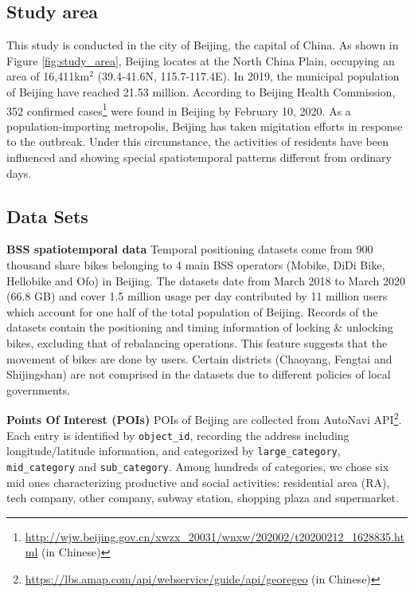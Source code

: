 \documentclass[preprints,ijgi,submit,moreauthors]{Definitions/mdpi}
\begin{document}
\subsection{Study area}
This study is conducted in the city of Beijing, the capital of China.
As shown in Figure \ref{fig:study_area}, Beijing locates at the North China Plain, occupying an area of 16,411km$^2$ (39.4{\degree}-41.6{\degree}N, 115.7{\degree}-117.4{\degree}E).
In 2019, the municipal population of Beijing have reached 21.53 million. According to Beijing Health Commission, 352 confirmed cases\footnote{\url{http://wjw.beijing.gov.cn/xwzx_20031/wnxw/202002/t20200212_1628835.html} (in Chinese)} were found in Beijing by February 10, 2020.
As a population-importing metropolis, Beijing has taken migitation efforts in response to the outbreak. 
Under this circumstance, the activities of residents have been influenced and showing special spatiotemporal patterns different from ordinary days.

\subsection{Data Sets}
\textbf{BSS spatiotemporal data} Temporal positioning datasets come from 900 thousand share bikes belonging to 4 main BSS operators (Mobike, DiDi Bike, Hellobike and Ofo) in Beijing.
The datasets date from March 2018 to March 2020 (66.8 GB) and cover 1.5 million usage per day contributed by 11 million users which account for one half of the total population of Beijing.
Records of the datasets contain the positioning and timing information of locking \& unlocking bikes, excluding that of rebalancing operations.
This feature suggests that the movement of bikes are done by users.
Certain districts (Chaoyang, Fengtai and Shijingshan) are not comprised in the datasets due to different policies of local governments.

\textbf{Points Of Interest (POIs)} POIs of Beijing are collected from AutoNavi API\footnote{\url{https://lbs.amap.com/api/webservice/guide/api/georegeo} (in Chinese)}.
Each entry is identified by \texttt{object\_id}, recording the address including longitude/latitude information, and categorized by \texttt{large\_category}, \texttt{mid\_category} and \texttt{sub\_category}.
Among hundreds of categories, we chose six mid ones characterizing productive and social activities: residential area (RA), tech company, other company, subway station, shopping plaza and supermarket.
\end{document}
